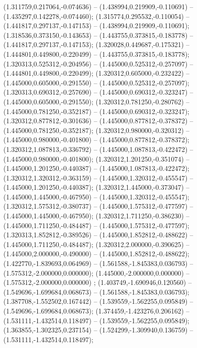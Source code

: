 (1.311759,0.217064,-0.074636) -- (1.438994,0.219909,-0.110691) -- (1.435297,0.142278,-0.074460);
 (1.315774,0.295532,-0.110054) -- (1.441817,0.297137,-0.147153) -- (1.438994,0.219909,-0.110691);
 (1.318536,0.373150,-0.143653) -- (1.443755,0.373815,-0.183778) -- (1.441817,0.297137,-0.147153);
 (1.320028,0.449687,-0.175321) -- (1.444801,0.449800,-0.220499) -- (1.443755,0.373815,-0.183778);
 (1.320313,0.525312,-0.204956) -- (1.445000,0.525312,-0.257097) -- (1.444801,0.449800,-0.220499);
 (1.320312,0.605000,-0.232422) -- (1.445000,0.605000,-0.291550) -- (1.445000,0.525312,-0.257097);
 (1.320313,0.690312,-0.257690) -- (1.445000,0.690312,-0.323247) -- (1.445000,0.605000,-0.291550);
 (1.320312,0.781250,-0.280762) -- (1.445000,0.781250,-0.352187) -- (1.445000,0.690312,-0.323247);
 (1.320312,0.877812,-0.301636) -- (1.445000,0.877812,-0.378372) -- (1.445000,0.781250,-0.352187);
 (1.320312,0.980000,-0.320312) -- (1.445000,0.980000,-0.401800) -- (1.445000,0.877812,-0.378372);
 (1.320312,1.087813,-0.336792) -- (1.445000,1.087813,-0.422472) -- (1.445000,0.980000,-0.401800);
 (1.320312,1.201250,-0.351074) -- (1.445000,1.201250,-0.440387) -- (1.445000,1.087813,-0.422472);
 (1.320312,1.320312,-0.363159) -- (1.445000,1.320312,-0.455547) -- (1.445000,1.201250,-0.440387);
 (1.320312,1.445000,-0.373047) -- (1.445000,1.445000,-0.467950) -- (1.445000,1.320312,-0.455547);
 (1.320312,1.575312,-0.380737) -- (1.445000,1.575312,-0.477597) -- (1.445000,1.445000,-0.467950);
 (1.320312,1.711250,-0.386230) -- (1.445000,1.711250,-0.484487) -- (1.445000,1.575312,-0.477597);
 (1.320313,1.852812,-0.389526) -- (1.445000,1.852812,-0.488622) -- (1.445000,1.711250,-0.484487);
 (1.320312,2.000000,-0.390625) -- (1.445000,2.000000,-0.490000) -- (1.445000,1.852812,-0.488622);
 (1.422770,-1.839693,0.064969) -- (1.561588,-1.845383,0.036793) -- (1.575312,-2.000000,0.000000);
 (1.445000,-2.000000,0.000000) -- (1.575312,-2.000000,0.000000) ;
 (1.403749,-1.690946,0.120560) -- (1.549696,-1.699684,0.068673) -- (1.561588,-1.845383,0.036793);
 (1.387708,-1.552502,0.167442) -- (1.539559,-1.562255,0.095849) -- (1.549696,-1.699684,0.068673);
 (1.374459,-1.423276,0.206162) -- (1.531111,-1.432514,0.118497) -- (1.539559,-1.562255,0.095849);
 (1.363855,-1.302325,0.237154) -- (1.524299,-1.309940,0.136759) -- (1.531111,-1.432514,0.118497);

